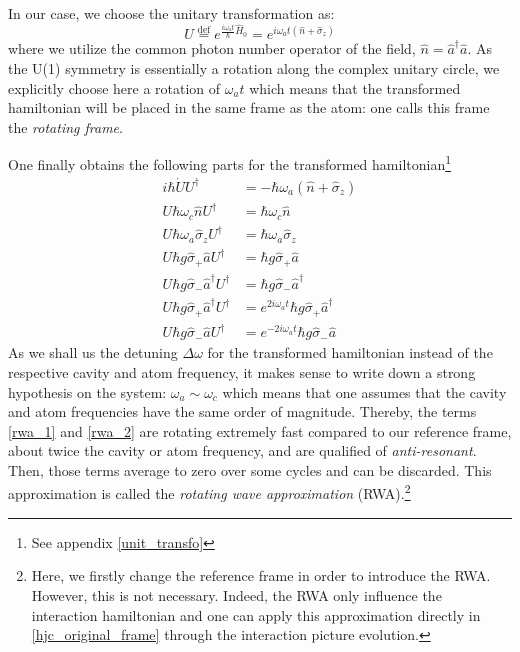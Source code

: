 \documentclass[11pt]{report}
\begin{document}
In our case, we choose the unitary transformation as:
\begin{equation}
\label{unitary_trans_def}
U \stackrel{\text{def}}{=} e^{\frac{i\omega_at}{\hbar}\hat{H}_0} = e^{i\omega_at(\hat{n} + \hat{\sigma}_z)}
\end{equation}
where we utilize the common photon number operator of the field, $\hat{n} = \hat{a}^{\dag}\hat{a}$. As the U(1) symmetry is essentially a rotation along the complex unitary circle, we explicitly choose here a rotation of $\omega_at$ which means that the transformed hamiltonian will be placed in the same frame as the atom: one calls this frame the \textit{rotating frame}.

One finally obtains the following parts for the transformed hamiltonian\footnote{See appendix \ref{unit_transfo}}
\begin{align}
i\hbar \dot{U} U^{\dag} &= -\hbar\omega_a(\hat{n} + \hat{\sigma}_z)\\
U\hbar \omega_c\hat{n} U^{\dag} &= \hbar\omega_c\hat{n}\\
U\hbar \omega_a\hat{\sigma}_z U^{\dag} &= \hbar\omega_a\hat{\sigma}_z\\
U\hbar g\hat{\sigma}_+\hat{a} U^{\dag} &= \hbar g\hat{\sigma}_+\hat{a}\\
U\hbar g\hat{\sigma}_-\hat{a}^{\dag} U^{\dag} &= \hbar g\hat{\sigma}_-\hat{a}^{\dag}\\
\label{rwa_1}
U\hbar g\hat{\sigma}_+\hat{a}^{\dag} U^{\dag} &= e^{2i\omega_at}\hbar g\hat{\sigma}_+\hat{a}^{\dag}\\
\label{rwa_2}
U\hbar g\hat{\sigma}_-\hat{a} U^{\dag} &= e^{-2i\omega_at}\hbar g\hat{\sigma}_-\hat{a}
\end{align}
As we shall us the detuning $\Delta\omega$ for the transformed hamiltonian instead of the respective cavity and atom frequency, it makes sense to write down a strong hypothesis on the system: $\omega_a \sim \omega_c$ which means that one assumes that the cavity and atom frequencies have the same order of magnitude. Thereby, the terms \eqref{rwa_1} and \eqref{rwa_2} are rotating extremely fast compared to our reference frame, about twice the cavity or atom frequency, and are qualified of \textit{anti-resonant}. Then, those terms average to zero over some cycles and can be discarded. This approximation is called the \textit{rotating wave approximation} (RWA).\footnote{Here, we firstly change the reference frame in order to introduce the RWA. However, this is not necessary. Indeed, the RWA only influence the interaction hamiltonian and one can apply this approximation directly in \eqref{hjc_original_frame} through the interaction picture evolution.}
\end{document}
